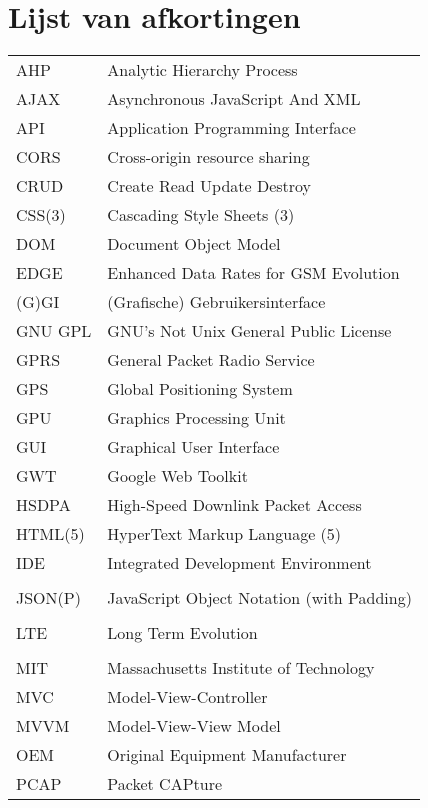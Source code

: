 \documentclass[master=cws,dutch,masteroption={vs,gs},inputenc=utf8]{kulemt}
\begin{document}
\chapter{Lijst van afkortingen}
\begin{flushleft}
  \renewcommand{\arraystretch}{1.1}
  \begin{longtable}{p{2cm} l}
     AHP & Analytic Hierarchy Process \\
     AJAX & Asynchronous JavaScript And XML \\
     API & Application Programming Interface \\
     CORS & Cross-origin resource sharing \\
     CRUD & Create Read Update Destroy \\
     CSS(3) & Cascading Style Sheets (3) \\
     DOM & Document Object Model \\
     EDGE & Enhanced Data Rates for GSM Evolution \\
     (G)GI & (Grafische) Gebruikersinterface \\
     GNU GPL & GNU's Not Unix General Public License \\
     GPRS & General Packet Radio Service \\
     GPS & Global Positioning System \\
     GPU & Graphics Processing Unit \\
     GUI & Graphical User Interface \\
     GWT & Google Web Toolkit \\
     HSDPA & High-Speed Downlink Packet Access \\
     HTML(5) & HyperText Markup Language (5) \\
     IDE & Integrated Development Environment \\
     \jqma{} & \jqm{} \\
     JSON(P)  & JavaScript Object Notation (with Padding) \\
     \kendoa{} & \kendo{} \\
     LTE & Long Term Evolution \\
     \lungoa{} & \lungo{} \\
     MIT & Massachusetts Institute of Technology \\
     MVC & Model-View-Controller \\
     MVVM & Model-View-View Model \\
     OEM & Original Equipment Manufacturer \\
     PCAP & Packet CAPture \\

\end{longtable}
\end{flushleft}
\end{document}
